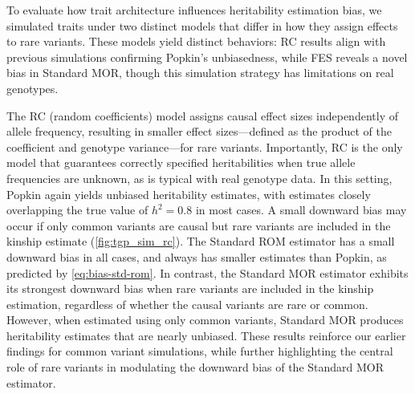 \documentclass[11pt]{article}
\begin{document}
To evaluate how trait architecture influences heritability estimation bias, we simulated traits under two distinct models that differ in how they assign effects to rare variants. These models yield distinct behaviors: RC results align with previous simulations confirming Popkin’s unbiasedness, while FES reveals a novel bias in Standard MOR, though this simulation strategy has limitations on real genotypes. 

The RC (random coefficients) model assigns causal effect sizes independently of allele frequency, resulting in smaller effect sizes—defined as the product of the coefficient and genotype variance—for rare variants. Importantly, RC is the only model that guarantees correctly specified heritabilities when true allele frequencies are unknown, as is typical with real genotype data.
In this setting, Popkin again yields unbiased heritability estimates, with estimates closely overlapping the true value of $h^2 = 0.8$ in most cases. A small downward bias may occur if only common variants are causal but rare variants are included in the kinship estimate (\cref{fig:tgp_sim_rc}).  
The Standard ROM estimator has a small downward bias in all cases, and always has smaller estimates than Popkin, as predicted by \cref{eq:bias-std-rom}.  
In contrast, the Standard MOR estimator exhibits its strongest downward bias when rare variants are included in the kinship estimation, regardless of whether the causal variants are rare or common.
However, when estimated using only common variants, Standard MOR produces heritability estimates that are nearly unbiased. 
These results reinforce our earlier findings for common variant simulations, while further highlighting the central role of rare variants in modulating the downward bias of the Standard MOR estimator.
\end{document}
